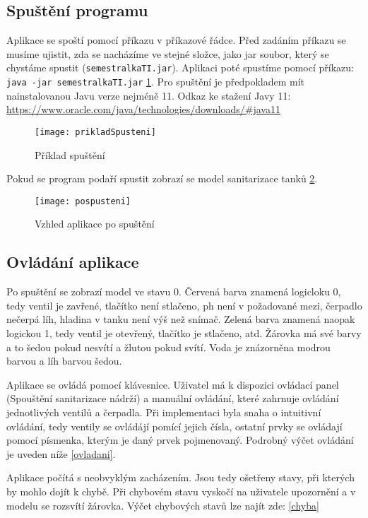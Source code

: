 \documentclass[12pt, a4paper]{article}
\begin{document}
\subsection{Spuštění programu}
Aplikace se spoští pomocí příkazu v příkazové řádce. Před zadáním příkazu se musíme ujistit, zda se nacházíme ve stejné složce, jako jar soubor, který se chystáme spustit (\texttt{semestralkaTI.jar}). Aplikaci poté spustíme pomocí příkazu: \texttt{java -jar semestralkaTI.jar} \ref{spusteni}. Pro spuštění je předpokladem mít nainstalovanou Javu verze nejméně 11. Odkaz ke stažení Javy 11: \url{ https://www.oracle.com/java/technologies/downloads/#java11}

\begin{figure}[h]
\centering 
\texttt{[image: prikladSpusteni]}
\caption{Příklad spuštění}
\label{spusteni}
\end{figure}

Pokud se program podaří spustit zobrazí se model sanitarizace tanků \ref{vzhled}.

\begin{figure}[h]
\centering 
\texttt{[image: pospusteni]}
\caption{Vzhled aplikace po spuštění}
\label{vzhled}
\end{figure}

\subsection{Ovládání aplikace}
Po spuštění se zobrazí model ve stavu 0. Červená barva znamená logicloku 0, tedy ventil je zavřené, tlačítko není stlačeno, ph není v požadované mezi, čerpadlo nečerpá líh, hladina v tanku není výš než snímač. Zelená barva znamená naopak logickou 1, tedy ventil je otevřený, tlačítko je stlačeno, atd. Žárovka má své barvy a to šedou pokud nesvítí a žlutou pokud svítí. Voda je znázorněna modrou barvou a líh barvou šedou.

Aplikace se ovládá pomocí klávesnice. Uživatel má k dispozici ovládací panel (Spouštění sanitarizace nádrží) a manuální ovládání, které zahrnuje ovládání jednotlivých ventilů a čerpadla. Při implementaci byla snaha o intuitivní ovládání, tedy ventily se ovládájí pomící jejich čísla, ostatní prvky se ovládají pomocí písmenka, kterým je daný prvek pojmenovaný. Podrobný výčet ovládání je uveden níže \ref{ovladani}.

Aplikace počítá s neobvyklým zacházením. Jsou tedy ošetřeny stavy, při kterých by mohlo dojít k chybě. Při chybovém stavu vyskočí na uživatele upozornění a v modelu se rozsvítí žárovka. Výčet chybových stavů lze najít zde: \ref{chyba}
\end{document}
